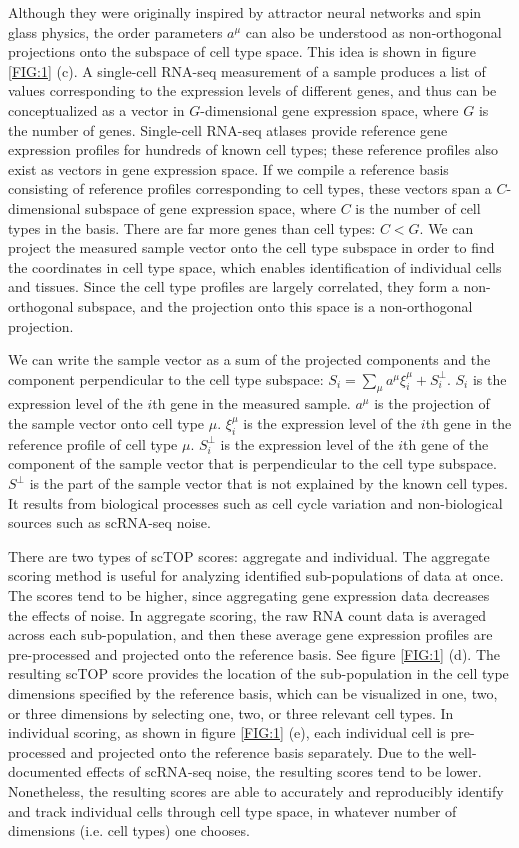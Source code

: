 \documentclass[aps,superscriptaddress, notitlepage,longbibliography]{revtex4-1}
\begin{document}
Although they were originally inspired by attractor neural networks and spin glass physics, the order parameters $a^{\mu}$ can also be understood as non-orthogonal projections onto the subspace of cell type space. This idea is shown in figure \ref{FIG:1} (c). A single-cell RNA-seq measurement of a sample produces a list of values corresponding to the expression levels of different genes, and thus can be conceptualized as a vector in $G$-dimensional gene expression space, where $G$ is the number of genes. Single-cell RNA-seq atlases provide reference gene expression profiles for hundreds of known cell types; these reference profiles also exist as vectors in gene expression space. If we compile a reference basis consisting of reference profiles corresponding to cell types, these vectors span a $C$-dimensional subspace of gene expression space, where $C$ is the number of cell types in the basis. There are far more genes than cell types: $C < G$. We can project the measured sample vector onto the cell type subspace in order to find the coordinates in cell type space, which enables identification of individual cells and tissues. Since the cell type profiles are largely correlated, they form a non-orthogonal subspace, and the projection onto this space is a non-orthogonal projection.

We can write the sample vector as a sum of the projected components and the component perpendicular to the cell type subspace: $S_i = \sum_\mu a^{\mu} \xi^{\mu}_i + S^{\perp}_i$. $S_i$ is the expression level of the $i$th gene in the measured sample. $a^{\mu}$ is the projection of the sample vector onto cell type $\mu$. $\xi^{\mu}_i$ is the expression level of the $i$th gene in the reference profile of cell type $\mu$. $S^{\perp}_i$ is the expression level of the $i$th gene of the component of the sample vector that is perpendicular to the cell type subspace. $S^{\perp}$ is the part of the sample vector that is not explained by the known cell types. It results from biological processes such as cell cycle variation and non-biological sources such as scRNA-seq noise. 

There are two types of scTOP scores: aggregate and individual. The aggregate scoring method is useful for analyzing identified sub-populations of data at once. The scores tend to be higher, since aggregating gene expression data decreases the effects of noise. In aggregate scoring, the raw RNA count data is averaged across each sub-population, and then these average gene expression profiles are pre-processed and projected onto the reference basis. See figure \ref{FIG:1} (d). The resulting scTOP score provides the location of the sub-population in the cell type dimensions specified by the reference basis, which can be visualized in one, two, or three dimensions by selecting one, two, or three relevant cell types. In individual scoring, as shown in figure \ref{FIG:1} (e), each individual cell is pre-processed and projected onto the reference basis separately. Due to the well-documented effects of scRNA-seq noise, the resulting scores tend to be lower. Nonetheless, the resulting scores are able to accurately and reproducibly identify and track individual cells through cell type space, in whatever number of dimensions (i.e. cell types) one chooses.
\end{document}
